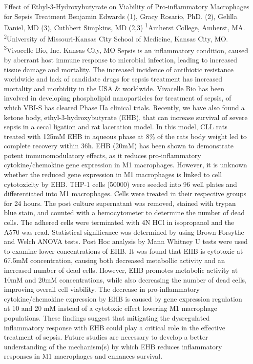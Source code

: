 \makeabstract
{
Effect of Ethyl-3-Hydroxybutyrate on Viability of Pro-inflammatory Macrophages for Sepsis Treatment
}
{
Benjamin Edwards (1), Gracy Rosario, PhD. (2), Gelilla Daniel, MD (3), Cuthbert Simpkins, MD (2,3)
}
{
\textsuperscript{1}Amherst College, Amherst, MA. \\
\textsuperscript{2}University of Missouri-Kansas City School of Medicine, Kansas City, MO. \\
\textsuperscript{3}Vivacelle Bio, Inc. Kansas City, MO
}
{
Sepsis is an inflammatory condition, caused by aberrant host immune response to microbial infection, leading to increased tissue damage and mortality. The increased incidence of antibiotic resistance worldwide and lack of candidate drugs for sepsis treatment has increased mortality and morbidity in the USA \& worldwide. Vivacelle Bio has been involved in developing phospholipid nanoparticles for treatment of sepsis, of which VBI-S has cleared Phase IIa clinical trials. Recently, we have also found a ketone body, ethyl-3-hydroxybutyrate (EHB), that can increase survival of severe sepsis in a cecal ligation and rat laceration model. In this model, CLL rats treated with 125mM EHB in aqueous phase at 8\% of the rats body weight led to complete recovery within 36h. EHB (20mM) has been shown to demonstrate potent immunomodulatory effects, as it reduces pro-inflammatory cytokine/chemokine gene expression in M1 macrophages. However, it is unknown whether the reduced gene expression in M1 macrophages is linked to cell cytotoxicity by EHB.
}
{
THP-1 cells (50000) were seeded into 96 well plates and differentiated into M1 macrophages. Cells were treated in their respective groups for 24 hours. The post culture supernatant was removed, stained with trypan blue stain, and counted with a hemocytometer to determine the number of dead cells. The adhered cells were terminated with 4N HCl in isopropanol and the A570 was read. Statistical significance was determined by using Brown Forsythe and Welch ANOVA tests. Post Hoc analysis by Mann Whitney U tests were used to examine lower concentrations of EHB.
}
{
It was found that EHB is cytotoxic at 67.5mM concentration, causing both decreased metabollic activity and an increased number of dead cells. However, EHB promotes metabolic activity at 10mM and 20mM concentrations, while also decreasing the number of dead cells, improving overall cell viability. 
}
{
The decrease in pro-inflammatory cytokine/chemokine expression by EHB is caused by gene expression regulation at 10 and 20 mM instead of a cytotoxic effect lowering M1 macrophage populations. These findings suggest that mitigating the dysregulated inflammatory response with EHB could play a critical role in the effective treatment of sepsis. Future studies are necessary to develop a better understanding of the mechanism(s) by which EHB reduces inflammatory responses in M1 macrophages and enhances survival.
}

\newpage
